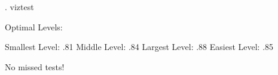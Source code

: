 . viztest
 
Optimal Levels: 
 
Smallest Level: .81
Middle Level: .84
Largest Level: .88
Easiest Level: .85
 
No missed tests!
